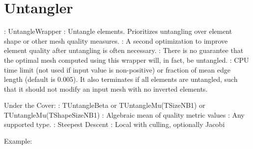 \newpage

\section{Untangler} \label{sec:Untangler}

: UntangleWrapper \newline
{}: Untangle elements.  Prioritizes untangling over
element shape or other mesh quality measures.  \newline
{}: A second optimization to improve element quality
after untangling is often necessary.  \newline
{}: There is no guarantee that the optimal mesh computed using this wrapper will, in fact, be untangled.  \newline 
{}: CPU time limit (not used if input 
value is non-positive) or fraction of mean edge length (default is 0.005).  It
also terminates if all elements are untangled, such that it should not modify
an input mesh with no inverted elements. \newline \newline

\noindent Under the Cover: \newline
{}: TUntangleBeta or TUntangleMu(TSizeNB1) or TUntangleMu(TShapeSizeNB1) \newline
{}: Algebraic mean of quality metric values \newline
{}: Any supported type. \newline
{}: Steepest Descent \newline
{}: Local with culling, optionally Jacobi \newline

\noindent Example: \newline

